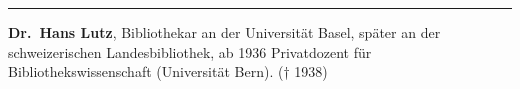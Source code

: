 \begin{center}\rule{0.5\linewidth}{\linethickness}\end{center}

\textbf{Dr.~Hans Lutz}, Bibliothekar an der Universität Basel, später an der schweizerischen Landesbibliothek, ab 1936 Privatdozent für
Bibliothekswissenschaft (Universität Bern). († 1938)
